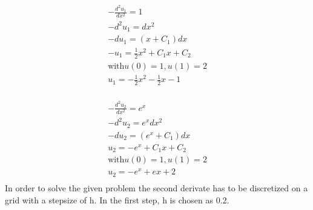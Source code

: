 \documentclass{article}
\begin{document}
\begin{align}
    -\frac{d^{2} u_1}{d x^{2}}=1 \\
    - d^2 u_1 = dx^2 \\
    - d u_1 = (x+C_1) dx\\
    - u_1 = \frac{1}{2}x^2 + C_1 x + C_2\\
    \text{with} u(0)=1,  u(1)=2 \\
    u_1 = -\frac{1}{2}x^2 - \frac{1}{2} x - 1\\
\end{align}

\begin{align}
    -\frac{d^{2} u_2}{d x^{2}}=e^x \\
    -d^2 u_2 = e^x dx^2 \\
    -d u_2 = (e^x+C_1) dx\\
    u_2 = -e^x + C_1 x + C_2\\
    \text{with} u(0)=1,  u(1)=2 \\
    u_2 = -e^x + e x + 2\\
\end{align}
In order to solve the given problem the second derivate has to be discretized on a grid with a stepsize of h. In the first step, h is chosen as $0.2$.

\begin{figure}[H]
    \centering
\end{figure}
\end{document}
